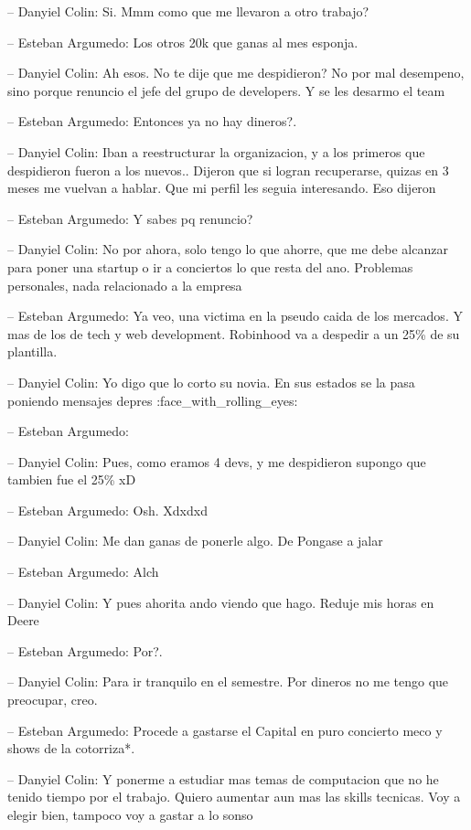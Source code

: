 -- Danyiel Colin: Si. Mmm como que me llevaron a otro trabajo?

-- Esteban Argumedo: Los otros 20k que ganas al mes esponja.

-- Danyiel Colin: Ah esos. No te dije que me despidieron? No por mal
desempeno, sino porque renuncio el jefe del grupo de developers. Y se
les desarmo el team

-- Esteban Argumedo: Entonces ya no hay dineros?.

-- Danyiel Colin: Iban a reestructurar la organizacion, y a los primeros
que despidieron fueron a los nuevos.. Dijeron que si logran recuperarse,
quizas en 3 meses me vuelvan a hablar. Que mi perfil les seguia
interesando. Eso dijeron

-- Esteban Argumedo: Y sabes pq renuncio?

-- Danyiel Colin: No por ahora, solo tengo lo que ahorre, que me debe
alcanzar para poner una startup o ir a conciertos lo que resta del ano.
Problemas personales, nada relacionado a la empresa

-- Esteban Argumedo: Ya veo, una victima en la pseudo caida de los
mercados. Y mas de los de tech y web development. Robinhood va a
despedir a un 25\% de su plantilla.

-- Danyiel Colin: Yo digo que lo corto su novia. En sus estados se la
pasa poniendo mensajes depres :face\_with\_rolling\_eyes:

-- Esteban Argumedo:

-- Danyiel Colin: Pues, como eramos 4 devs, y me despidieron supongo que
tambien fue el 25\% xD

-- Esteban Argumedo: Osh. Xdxdxd

-- Danyiel Colin: Me dan ganas de ponerle algo. De Pongase a jalar

-- Esteban Argumedo: Alch

-- Danyiel Colin: Y pues ahorita ando viendo que hago. Reduje mis horas
en Deere

-- Esteban Argumedo: Por?.

-- Danyiel Colin: Para ir tranquilo en el semestre. Por dineros no me
tengo que preocupar, creo.

-- Esteban Argumedo: Procede a gastarse el Capital en puro concierto
meco y shows de la cotorriza*.

-- Danyiel Colin: Y ponerme a estudiar mas temas de computacion que no
he tenido tiempo por el trabajo. Quiero aumentar aun mas las skills
tecnicas. Voy a elegir bien, tampoco voy a gastar a lo sonso

